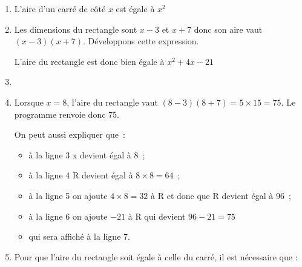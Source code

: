 
\medskip
\begin{enumerate}[itemsep=1em]
\item L'aire d'un carré de côté $x$ est égale à $x^2$
\item Les dimensions du rectangle sont $x-3$ et $x+7$ donc son aire vaut $(x-3)(x+7)$. Développons cette expression.

L'aire du rectangle est donc bien égale à $x^2+4x-21$
    \item
     \begin{scratch}[scale=0.75,print]
	\end{scratch}
	\item Lorsque $x=8$, l'aire du rectangle vaut $(8-3)(8+7)=5\times15=75$. Le programme renvoie donc 75.
	
	On peut aussi expliquer que~:
	\begin{itemize}
	    \item à la ligne 3 x devient égal à 8~;
	    \item à la ligne 4 R devient égal à $8\times8=64$~;
	    \item à la ligne 5 on ajoute $4\times8=32$ à R et donc que R devient égal à 96~;
	    \item à la ligne 6 on ajoute $-21$ à R qui devient $96-21=75$
	    \item qui sera affiché à la ligne 7.
	\end{itemize}
	
	\item Pour que l'aire du rectangle soit égale à celle du carré, il est nécessaire que :\par
	


\end{enumerate}
